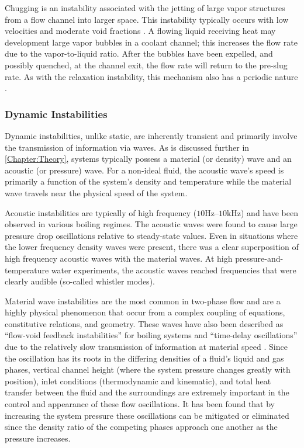 Chugging is an instability associated with the jetting of large vapor structures from a flow channel into larger space.
This instability typically occurs with low velocities and moderate void fractions \cite{tong_boiling_1997}.
A flowing liquid receiving heat may development large vapor bubbles in a coolant channel; this increases the flow rate due to the vapor-to-liquid ratio.
After the bubbles have been expelled, and possibly quenched, at the channel exit, the flow rate will return to the pre-slug rate.
As with the relaxation instability, this mechanism also has a periodic nature \cite{aritomi_geysering_1993}.



\subsubsection{Dynamic Instabilities}
Dynamic instabilities, unlike static, are inherently transient and primarily involve the transmission of information via waves.
As is discussed further in \cref{Chapter:Theory}, \THs systems typically possess a material (or density) wave and an acoustic (or pressure) wave.
For a non-ideal fluid, the acoustic wave's speed is primarily a function of the system's density and temperature while the material wave travels near the physical speed of the system.

Acoustic instabilities are typically of high frequency ($10$Hz--$10$kHz) and have been observed in various boiling regimes.
The acoustic waves were found to cause large pressure drop oscillations relative to steady-state values.
Even in situations where the lower frequency density waves were present, there was a clear superposition of high frequency acoustic waves with the material waves.
At high pressure-and-temperature water experiments, the acoustic waves reached frequencies that were clearly audible (so-called whistler modes).

Material wave instabilities are the most common in two-phase flow and are a highly physical phenomenon that occur from a complex coupling of \THs equations, constitutive relations, and geometry.
These waves have also been described as ``flow-void feedback instabilities'' for boiling systems \cite{neal_mechanisms_1967} and ``time-delay oscillations'' due to the relatively slow transmission of information at material speed \cite{boure_oscillatory_1966}.
Since the oscillation has its roots in the differing densities of a fluid's liquid and gas phases, vertical channel height (where the system pressure changes greatly with position), inlet conditions (thermodynamic and kinematic), and total heat transfer between the fluid and the surroundings are extremely important in the control and appearance of these flow oscillations.
It has been found that by increasing the system pressure these oscillations can be mitigated or eliminated since the density ratio of the competing phases approach one another as the pressure increases.

